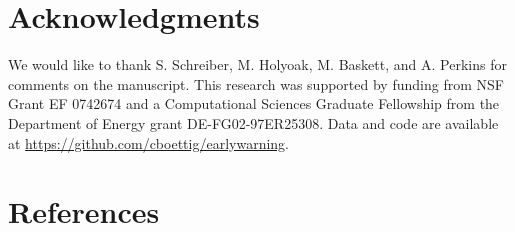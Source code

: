 \documentclass[authoryear,review,11pt]{elsarticle}
\begin{document}
\section{Acknowledgments}
We would like to thank S. Schreiber, M. Holyoak, M. Baskett, and A. Perkins for comments on the manuscript. 
This research was supported by funding from NSF Grant EF 0742674 
and a Computational Sciences Graduate Fellowship from the Department of Energy grant DE-FG02-97ER25308. 
Data and code are available at \href{https://github.com/cboettig/earlywarning}{ https://github.com/cboettig/earlywarning}.




\section{References}%

%
 
\end{document}
